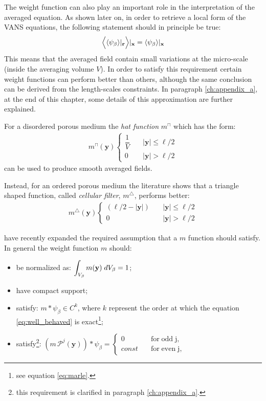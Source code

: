 The weight function can  also play an important role in the interpretation of the averaged equation. As shown later on, in order to retrieve a local form of the VANS equations, the following statement should in principle be true:
\begin{equation}
\Big\langle {\left< \psi_{\beta} \right>}|_{\mathbf{r}}  \Big\rangle  |_{\mathbf{x}} = {\left< \psi_{\beta} \right>}|_{\mathbf{x}}
\label{eq:well_behaved}
\end{equation}
This means that the averaged field contain small variations at the micro-scale (inside the averaging volume $V$).
In order to satisfy this requirement certain weight functions can perform better than others, although the same conclusion can be derived from the length-scales constraints.
In paragraph \ref{ch:appendix_a}, at the end of this chapter, some details of this approximation are further explained.

For a disordered porous medium the \textit{hat function} $m^{\sqcap}$ which has the form:
\begin{eqnarray}
	m^{\sqcap}(\mathbf{y}) 
	\begin{cases}
		\dfrac{1}{V} \quad &|\mathbf{y}| \leqslant  \ell/2\\
		0 \quad &|\mathbf{y}|>  \ell/2
	\end{cases}
\end{eqnarray}
can be used to produce smooth averaged fields.

Instead, for an ordered porous medium the literature shows that a triangle shaped function, called \textit{cellular filter}, $m^{\bigtriangleup}$,  performs better:
\begin{eqnarray}
m^{\bigtriangleup}(\mathbf{y}) 
\begin{cases}
(\ell/2 - |\mathbf{y}|) \quad &|\mathbf{y}| \leqslant \ell/2\\
0 \quad &|\mathbf{y}|>  \ell/2
\end{cases}
\end{eqnarray}

\citet{davit2017technical} have recently expanded the required assumption that a $m$ function should satisfy. In general the weight function $m$ should:
\begin{itemize}
	\item be normalized as: $\displaystyle\int_{V_\beta}  m(\mathbf{y}) \; dV_\beta = 1$;
	\item have compact support;
	\item satisfy: $m*\psi_{\beta} \in C^{k}$, where $k$ represent the order at which the equation \eqref{eq:well_behaved} is exact\footnote{see equation \eqref{eq:marle}.};
	\item satisfy\footnote{this requirement is clarified in paragraph \ref{ch:appendix_a}.}: $(m \, \mathcal{P}^j(\mathbf{y}))*\psi_{\beta} = 
	\begin{cases}
	0 \quad &\textrm{for} \; \textrm{odd} \; \textrm{j},\\
	const  \quad &\textrm{for} \; \textrm{even} \; \textrm{j},
	\end{cases}$
\end{itemize}

